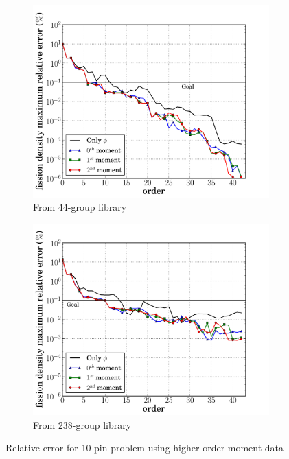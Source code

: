 \documentclass[5p,times,twocolumn,10pt]{elsarticle}
\begin{document}
    \begin{figure}[tb]
        \centering
        \begin{subfigure}{0.5\textwidth}
            \centering
            \includegraphics[trim=.1cm .25cm 2.0cm .4cm, clip=true,
            totalheight=0.261\textheight]
            {10pin_44_angular_comparison_fission_10-pin-44}
            \caption{From 44-group library}
            \label{fig:10-pin_angularA}
        \end{subfigure}%
        \begin{subfigure}{0.5\textwidth}
            \centering
            \includegraphics[trim=.1cm .25cm 2.0cm .4cm, clip=true,
            totalheight=0.261\textheight]
            {10pin_238_angular_comparison_fission_10-pin-44}
            \caption{From 238-group library}
            \label{fig:10-pin_angularB}
        \end{subfigure}
        \caption{Relative error for 10-pin problem using higher-order moment
            data}
        \label{fig:10-pin_angular}
    \end{figure}
\end{document}

